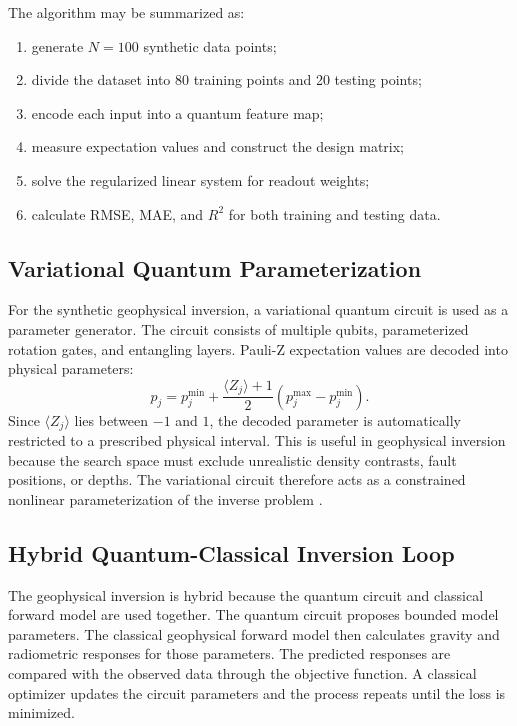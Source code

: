 \documentclass[12pt,a4paper]{article}
\begin{document}
The algorithm may be summarized as:
\begin{enumerate}
    \item generate $N=100$ synthetic data points;
    \item divide the dataset into 80 training points and 20 testing points;
    \item encode each input into a quantum feature map;
    \item measure expectation values and construct the design matrix;
    \item solve the regularized linear system for readout weights;
    \item calculate RMSE, MAE, and $R^2$ for both training and testing data.
\end{enumerate}

\subsection{Variational Quantum Parameterization}
For the synthetic geophysical inversion, a variational quantum circuit is used as a parameter generator. The circuit consists of multiple qubits, parameterized rotation gates, and entangling layers. Pauli-Z expectation values are decoded into physical parameters:
\begin{equation}
    p_j =
    p_j^{\min}
    +
    \frac{\langle Z_j\rangle+1}{2}
    (p_j^{\max}-p_j^{\min}).
\end{equation}
Since $\langle Z_j\rangle$ lies between $-1$ and $1$, the decoded parameter is automatically restricted to a prescribed physical interval. This is useful in geophysical inversion because the search space must exclude unrealistic density contrasts, fault positions, or depths. The variational circuit therefore acts as a constrained nonlinear parameterization of the inverse problem \cite{cerezo2021}.

\subsection{Hybrid Quantum-Classical Inversion Loop}
The geophysical inversion is hybrid because the quantum circuit and classical forward model are used together. The quantum circuit proposes bounded model parameters. The classical geophysical forward model then calculates gravity and radiometric responses for those parameters. The predicted responses are compared with the observed data through the objective function. A classical optimizer updates the circuit parameters and the process repeats until the loss is minimized.
\end{document}

